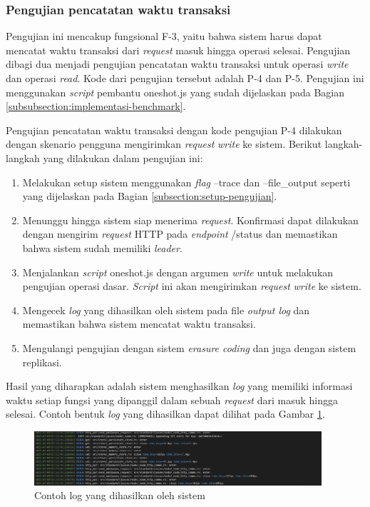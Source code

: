 \subsubsection{Pengujian pencatatan waktu transaksi}
\label{subsubsection:pengujian-pencatatan-waktu-transaksi}

Pengujian ini mencakup fungsional F-3, yaitu bahwa sistem harus dapat mencatat waktu transaksi dari \textit{request} masuk hingga operasi selesai. Pengujian dibagi dua menjadi pengujian pencatatan waktu transaksi untuk operasi \textit{write} dan operasi \textit{read}. Kode dari pengujian tersebut adalah P-4 dan P-5. Pengujian ini menggunakan \textit{script} pembantu oneshot.js yang sudah dijelaskan pada Bagian \ref{subsubsection:implementasi-benchmark}.

Pengujian pencatatan waktu transaksi dengan kode pengujian P-4 dilakukan dengan skenario pengguna mengirimkan \textit{request} \textit{write} ke sistem. Berikut langkah-langkah yang dilakukan dalam pengujian ini:

\begin{enumerate}
	\item Melakukan setup sistem menggunakan \textit{flag} --trace dan --file\_output seperti yang dijelaskan pada Bagian \ref{subsection:setup-pengujian}.
	\item Menunggu hingga sistem siap menerima \textit{request}. Konfirmasi dapat dilakukan dengan mengirim \textit{request} HTTP pada \textit{endpoint} /status dan memastikan bahwa sistem sudah memiliki \textit{leader}.
	\item Menjalankan \textit{script} oneshot.js dengan argumen \textit{write} untuk melakukan pengujian operasi dasar. \textit{Script} ini akan mengirimkan \textit{request} \textit{write} ke sistem.
	\item Mengecek \textit{log} yang dihasilkan oleh sistem pada file \textit{output log} dan memastikan bahwa sistem mencatat waktu transaksi.
	\item Mengulangi pengujian dengan sistem \textit{erasure coding} dan juga dengan sistem replikasi.
\end{enumerate}

Hasil yang diharapkan adalah sistem menghasilkan \textit{log} yang memiliki informasi waktu setiap fungsi yang dipanggil dalam sebuah \textit{request} dari masuk hingga selesai. Contoh bentuk \textit{log} yang dihasilkan dapat dilihat pada Gambar \ref{fig:log-trace}.

\begin{figure}[ht]
	\centering
	\includegraphics[width=0.95\textwidth]{resources/chapter-4/log-trace.png}
	\caption{Contoh log yang dihasilkan oleh sistem}
	\label{fig:log-trace}
\end{figure}

